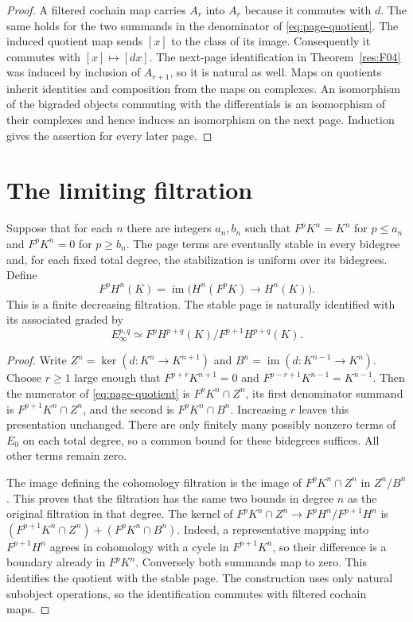 \begin{proof}
A filtered cochain map carries $A_r$ into $A_r$ because it commutes
with $d$. The same holds for the two summands in the denominator of
\eqref{eq:page-quotient}. The induced quotient map sends $[x]$ to
the class of its image. Consequently it commutes with $[x]\mapsto[dx]$.
The next-page identification in Theorem~\ref{res:F04} was induced
by inclusion of $A_{r+1}$, so it is natural as well. Maps on quotients
inherit identities and composition from the maps on complexes.
An isomorphism of the bigraded objects commuting with the differentials
is an isomorphism of their complexes and hence induces an isomorphism
on the next page. Induction gives the assertion for every later page.
\end{proof}

\section{The limiting filtration}

\begin{theorem}
\label{res:S01}
Suppose that for each $n$ there are integers $a_n,b_n$ such that
$F^pK^n=K^n$ for $p\leq a_n$ and $F^pK^n=0$ for $p\geq b_n$.
The page terms are eventually stable in every bidegree and, for
each fixed total degree, the stabilization is uniform over its
bidegrees. Define
\[
 F^pH^n(K)=\operatorname{im}\bigl(H^n(F^pK)\longrightarrow H^n(K)\bigr).
\]
This is a finite decreasing filtration. The stable page is
naturally identified with its associated graded by
\[
 E_\infty^{p,q}\simeq
 F^pH^{p+q}(K)/F^{p+1}H^{p+q}(K).
\]
\end{theorem}

\begin{proof}
Write $Z^n=\ker(d\colon K^n\to K^{n+1})$ and
$B^n=\operatorname{im}(d\colon K^{n-1}\to K^n)$.
Choose $r\geq1$ large enough that $F^{p+r}K^{n+1}=0$ and
$F^{p-r+1}K^{n-1}=K^{n-1}$. Then the numerator of
\eqref{eq:page-quotient} is $F^pK^n\cap Z^n$, its first denominator
summand is $F^{p+1}K^n\cap Z^n$, and the second is
$F^pK^n\cap B^n$. Increasing $r$ leaves this presentation
unchanged. There are only finitely many possibly nonzero terms
of $E_0$ on each total degree, so a common bound for these
bidegrees suffices. All other terms remain zero.

The image defining the cohomology filtration is the image of
$F^pK^n\cap Z^n$ in $Z^n/B^n$. This proves that the filtration
has the same two bounds in degree $n$ as the original
filtration in that degree. The kernel of
$F^pK^n\cap Z^n\longrightarrow F^pH^n/F^{p+1}H^n$ is
$(F^{p+1}K^n\cap Z^n)+(F^pK^n\cap B^n)$. Indeed, a
representative mapping into $F^{p+1}H^n$ agrees in cohomology
with a cycle in $F^{p+1}K^n$, so their difference is a boundary
already in $F^pK^n$. Conversely both summands map to zero.
This identifies the quotient with the stable page. The construction
uses only natural subobject operations, so the identification
commutes with filtered cochain maps.
\end{proof}


